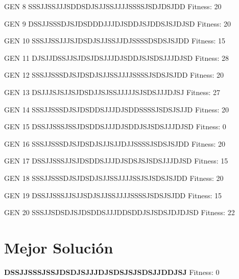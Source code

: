 \documentclass[a4paper,12pt]{article}
\begin{document}
GEN 8 SSSJJSSJJJSDDSDJSJJSSJJJJSSSSJSDJDSJDD Fitness: 20

GEN 9 DSSJJSSSDJSJDSDDDJJJDJSDDJSJDDSJSJDJSD Fitness: 20

GEN 10 SSSJJSSJJJSJDSDJSJJSSJJDJSSSSDSDSJSJDD Fitness: 15

GEN 11 DJSJJDSSJJSJDSJDSJJJDJSDDJSJSDSJJJDJSD Fitness: 28

GEN 12 SSSJJSSSDJSJDSDJSJJSSJJJJSSSSJSDSJSJDD Fitness: 20

GEN 13 DSJJJSJSJJSJDSDJJSJSSJJJJJSJSDSJJJDJSJ Fitness: 27

GEN 14 SSSJJSSSDJSJDSDDSJJJDJSDDSSSSJSDSJSJJD Fitness: 20

GEN 15 DSSJJSSSJSSJDSDDSJJJDJSDDJSJSDSJJJDJSD Fitness: 0

GEN 16 SSSJJSSSDJSJDSDJSJJSJJDJJSSSSJSDSJSJDD Fitness: 20

GEN 17 DSSJJSSSJJSJDSDDSJJJDJSDSJSJSDSJJJDJSD Fitness: 15

GEN 18 SSSJJSSSDJSJDSDJSJJSSJJJJSSJSJSDSJSJDD Fitness: 20

GEN 19 DSSJJSSSJJSJJSDJSJJSSJJJJSSSSJSDSJSJDD Fitness: 15

GEN 20 SSSJJSDSDJSJDSDDSJJJDDSDDJSJSDSJDJDJSD Fitness: 22


\section*{Mejor Solución}
\textbf{DSSJJSSSJSSJDSDJSJJJDJSDSJSJSDSJJDDJSJ} \newline
Fitness: 0
\end{document}
